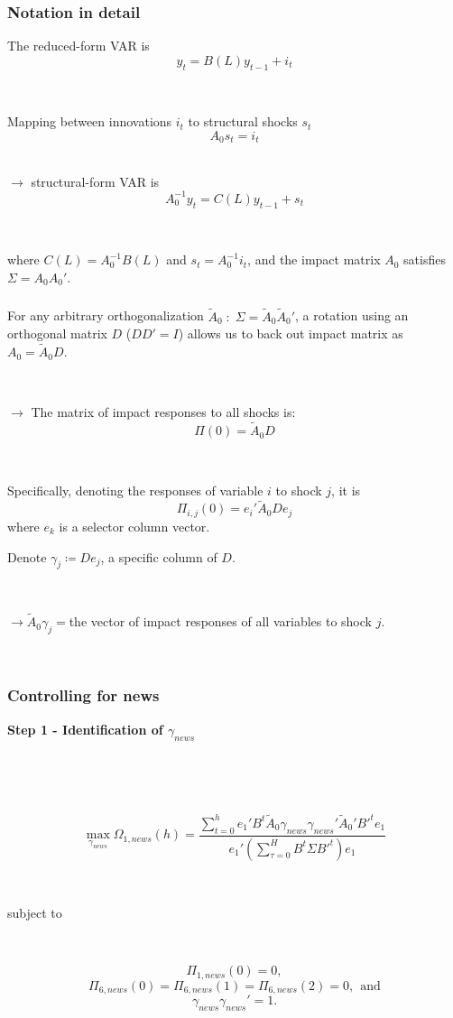 \documentclass{beamer}
\begin{document}
\begin{frame}
	\frametitle{Notation in detail}
	\label{VAR_notation}
The reduced-form VAR is
$$
y_t = B(L)y_{t-1} + i_t 
$$

\

Mapping between innovations $i_t$ to structural shocks $s_t$
$$
A_0 s_t = i_t
$$
\

$\rightarrow$ structural-form VAR is
$$
A_0^{-1}y_t = C(L) y_{t-1} + s_t
$$

\

where $C(L) = A_0^{-1} B(L)$ and $s_t = A_0^{-1} i_t$, and the impact matrix $A_0$ satisfies $\Sigma = A_0 A_0'$. 

\end{frame}

\begin{frame}
	\frametitle{}

For any arbitrary orthogonalization $\tilde{A}_0 \; : \; \Sigma = \tilde{A}_0 \tilde{A}_0'$, a rotation using an orthogonal matrix $D$ ($DD' = I$) allows us to back out impact matrix as $A_0 = \tilde{A}_0 D$. 

\

$\rightarrow$ The matrix of impact responses to all shocks is: 
$$
\Pi(0) = \tilde{A}_0 D
$$

\

Specifically, denoting the responses of variable $i$ to shock $j$, it is
$$
\Pi_{i,j}(0) = e_i' \tilde{A}_0 D e_j
$$
where $e_k$ is a selector column vector.

Denote $\gamma_j \coloneqq De_j$, a specific column of $D$. 

\

$\rightarrow \tilde{A}_0\gamma_j =$the vector of impact responses of all variables to shock $j$.

\

\hyperlink{baseline_spec}{}	
\end{frame}



\begin{frame}
	\frametitle{Controlling for news}
	\label{controlling_news}
\textbf{Step 1 - Identification of $\gamma_{news}$} 	

\

\

$$
\max_{\gamma_{news}} \Omega_{1,news}(h) = \frac{ \sum_{t=0}^h e_1' B^t \tilde{A}_0 \gamma_{news} \gamma_{news}' \tilde{A}_0' B'^t e_1 } {e_1' ( \sum_{\tau = 0}^H B^t \Sigma B'^t )e_1}
$$

\

subject to

\

$$
\Pi_{1,news}(0) = 0,
$$
$$
\Pi_{6,news}(0) = \Pi_{6,news}(1) = \Pi_{6,news}(2) = 0, \ \ \text{and}
$$
$$
\gamma_{news} \gamma_{news}' = 1.
$$


\end{frame}
\end{document}
